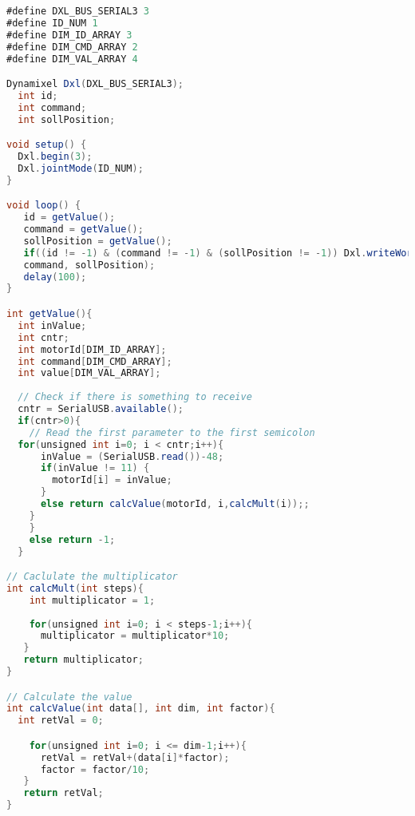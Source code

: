 \label{lst:OpenCMcode}
\begin{lstlisting}[language=java, caption=Programm OpenCM]
#define DXL_BUS_SERIAL3 3
#define ID_NUM 1
#define DIM_ID_ARRAY 3
#define DIM_CMD_ARRAY 2
#define DIM_VAL_ARRAY 4

Dynamixel Dxl(DXL_BUS_SERIAL3);
  int id;
  int command;
  int sollPosition;

void setup() {
  Dxl.begin(3);
  Dxl.jointMode(ID_NUM);
}

void loop() {
   id = getValue();
   command = getValue();
   sollPosition = getValue();
   if((id != -1) & (command != -1) & (sollPosition != -1)) Dxl.writeWord(id, 
   command, sollPosition);
   delay(100);
}

int getValue(){
  int inValue;
  int cntr;
  int motorId[DIM_ID_ARRAY];
  int command[DIM_CMD_ARRAY];
  int value[DIM_VAL_ARRAY];
   
  // Check if there is something to receive
  cntr = SerialUSB.available();  
  if(cntr>0){
    // Read the first parameter to the first semicolon
  for(unsigned int i=0; i < cntr;i++){
      inValue = (SerialUSB.read())-48;
      if(inValue != 11) {
        motorId[i] = inValue; 
      }
      else return calcValue(motorId, i,calcMult(i));;
    }
    }
    else return -1;
  } 

// Caclulate the multiplicator
int calcMult(int steps){
    int multiplicator = 1;
    
    for(unsigned int i=0; i < steps-1;i++){
      multiplicator = multiplicator*10;
   }
   return multiplicator;
}

// Calculate the value
int calcValue(int data[], int dim, int factor){
  int retVal = 0;

    for(unsigned int i=0; i <= dim-1;i++){
      retVal = retVal+(data[i]*factor);
      factor = factor/10;
   }  
   return retVal;
}
\end{lstlisting}